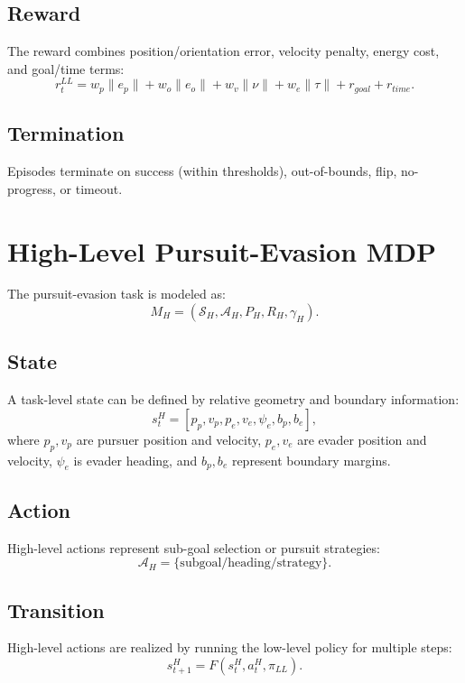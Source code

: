 \documentclass[11pt]{article}
\begin{document}
\subsection*{Reward}
The reward combines position/orientation error, velocity penalty, energy cost, and goal/time terms:
\begin{equation}
 r_t^{LL} = w_p\|e_p\| + w_o\|e_o\| + w_v\|\nu\| + w_e\|\tau\| + r_{goal} + r_{time}.
\end{equation}

\subsection*{Termination}
Episodes terminate on success (within thresholds), out-of-bounds, flip, no-progress, or timeout.

\section{High-Level Pursuit-Evasion MDP}
The pursuit-evasion task is modeled as:
\begin{equation}
M_H = (\mathcal{S}_H, \mathcal{A}_H, P_H, R_H, \gamma_H).
\end{equation}

\subsection*{State}
A task-level state can be defined by relative geometry and boundary information:
\begin{equation}
 s_t^H = [p_p, v_p, p_e, v_e, \psi_e, b_p, b_e],
\end{equation}
where $p_p, v_p$ are pursuer position and velocity, $p_e, v_e$ are evader position and velocity, $\psi_e$ is evader heading, and $b_p, b_e$ represent boundary margins.

\subsection*{Action}
High-level actions represent sub-goal selection or pursuit strategies:
\begin{equation}
 \mathcal{A}_H = \{\text{subgoal/heading/strategy}\}.
\end{equation}

\subsection*{Transition}
High-level actions are realized by running the low-level policy for multiple steps:
\begin{equation}
 s_{t+1}^{H} = F(s_t^{H}, a_t^{H}, \pi_{LL}).
\end{equation}
\end{document}
